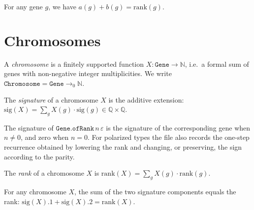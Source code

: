 \begin{lemma}
  \label{lem:Gene.signature_sum_eq_rank}
  \leanok
  For any gene $g$, we have $a(g) + b(g) = \mathrm{rank}(g)$.
\end{lemma}

\section{Chromosomes}

\begin{definition}[Chromosome]
  \label{def:Chromosome}
  \leanok
  A \emph{chromosome} is a finitely supported function $X \colon \mathtt{Gene} \to \mathbb{N}$,
  i.e.\ a formal sum of genes with non-negative integer multiplicities.
  We write $\mathtt{Chromosome} = \mathtt{Gene} \to_0 \mathbb{N}$.
\end{definition}

\begin{definition}
  \label{def:Chromosome.signature}
  \leanok
  The \emph{signature} of a chromosome $X$ is the additive extension:
  $\mathrm{sig}(X) = \sum_{g} X(g) \cdot \mathrm{sig}(g) \in \mathbb{Q} \times \mathbb{Q}$.
\end{definition}

\begin{lemma}
  \label{lem:Chromosome.signature_ofRank}
  \leanok
  The signature of $\mathtt{Gene.ofRank}\,n\,\varepsilon$ is the signature of
  the corresponding gene when $n\ne 0$, and zero when $n=0$.  For polarized
  types the file also records the one-step recurrence obtained by lowering the
  rank and changing, or preserving, the sign according to the parity.
\end{lemma}

\begin{definition}[Rank]
  \label{def:Chromosome.rank}
  \leanok
  The \emph{rank} of a chromosome $X$ is $\mathrm{rank}(X) = \sum_g X(g) \cdot \mathrm{rank}(g)$.
\end{definition}

\begin{lemma}
  \label{lem:Chromosome.signature_sum_eq_rank}
  \leanok
  For any chromosome $X$, the sum of the two signature components equals the rank:
  $\mathrm{sig}(X).1 + \mathrm{sig}(X).2 = \mathrm{rank}(X)$.
\end{lemma}

